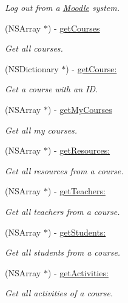 \begin{DoxyCompactItemize}
\begin{DoxyCompactList}\small\item\em Log out from a \hyperlink{interface_moodle}{Moodle} system. \item\end{DoxyCompactList}\item 
(NSArray $\ast$) -\/ \hyperlink{interface_moodle_a04e4a2082a8100dc2f1f6948bd843aa6}{getCourses}
\begin{DoxyCompactList}\small\item\em Get all courses. \item\end{DoxyCompactList}\item 
(NSDictionary $\ast$) -\/ \hyperlink{interface_moodle_a2abf5272330348bfac86e2714874ed10}{getCourse:}
\begin{DoxyCompactList}\small\item\em Get a course with an ID. \item\end{DoxyCompactList}\item 
(NSArray $\ast$) -\/ \hyperlink{interface_moodle_a5ea7cf4b73cc15399410a1c7d8875984}{getMyCourses}
\begin{DoxyCompactList}\small\item\em Get all my courses. \item\end{DoxyCompactList}\item 
(NSArray $\ast$) -\/ \hyperlink{interface_moodle_a71ccbe28df5d535d316ac3de507d1bc7}{getResources:}
\begin{DoxyCompactList}\small\item\em Get all resources from a course. \item\end{DoxyCompactList}\item 
(NSArray $\ast$) -\/ \hyperlink{interface_moodle_ad24bfc36948fc830ad21c7867b8e3793}{getTeachers:}
\begin{DoxyCompactList}\small\item\em Get all teachers from a course. \item\end{DoxyCompactList}\item 
(NSArray $\ast$) -\/ \hyperlink{interface_moodle_a0a15c6cd198f7448b8f363d2b5a3e33d}{getStudents:}
\begin{DoxyCompactList}\small\item\em Get all students from a course. \item\end{DoxyCompactList}\item 
(NSArray $\ast$) -\/ \hyperlink{interface_moodle_a7c17a97046fb3e9f9770c35bf5aa568c}{getActivities:}
\begin{DoxyCompactList}\small\item\em Get all activities of a course. \item\end{DoxyCompactList}\end{DoxyCompactItemize}
